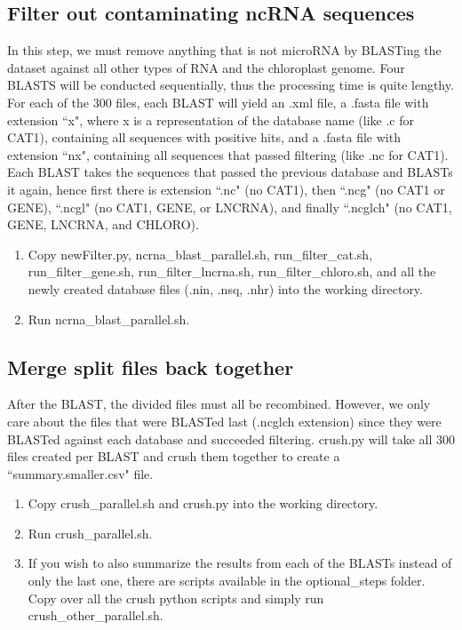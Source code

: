 \documentclass[12pt,titlepage]{article}
\begin{document}
\subsection{Filter out contaminating ncRNA sequences}
In this step, we must remove anything that is not microRNA by BLASTing the dataset against all other types of RNA and the chloroplast genome. Four BLASTS will be conducted sequentially, thus the processing time is quite lengthy. For each of the 300 files, each BLAST will yield an .xml file, a .fasta file with extension ``x", where x is a representation of the database name (like .c for CAT1), containing all sequences with positive hits, and a .fasta file with extension ``nx", containing all sequences that passed filtering (like .nc for CAT1). Each BLAST takes the sequences that passed the previous database and BLASTs it again, hence first there is extension ``.nc" (no CAT1), then ``.ncg" (no CAT1 or GENE), ``.ncgl" (no CAT1, GENE, or LNCRNA), and finally ``.ncglch" (no CAT1, GENE, LNCRNA, and CHLORO).
\begin{enumerate}
\item Copy newFilter.py, ncrna\_blast\_parallel.sh, run\_filter\_cat.sh, run\_filter\_gene.sh, run\_filter\_lncrna.sh, run\_filter\_chloro.sh, and all the newly created database files (.nin, .nsq, .nhr) into the working directory. 
\item Run ncrna\_blast\_parallel.sh.
\end{enumerate} 

\subsection{Merge split files back together}
After the BLAST, the divided files must all be recombined. However, we only care about the files that were BLASTed last (.ncglch extension) since they were BLASTed against each database and succeeded filtering. crush.py will take all 300 files created per BLAST and crush them together to create a ``summary.smaller.csv" file. 
\begin{enumerate}
\item Copy crush\_parallel.sh and crush.py into the working directory.
\item Run crush\_parallel.sh.
\item If you wish to also summarize the results from each of the BLASTs instead of only the last one, there are scripts available in the optional\_steps folder. Copy over all the crush python scripts and simply run crush\_other\_parallel.sh. 
\end{enumerate}
\end{document}
